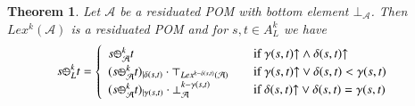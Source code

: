 \documentclass[a4paper]{elsarticle}
\newtheorem{theorem}{Theorem}
\newcommand{\1}{\mathbf{1}}
\def\odiv{{ \ominus\hspace{-8pt}:}\;}
\begin{document}
\begin{theorem}\label{prop:lexiRes}
	Let $\mathcal{A}$ be a residuated POM with bottom
	element $\bot_\mathcal{A}$.
	Then $Lex^k(\mathcal{A})$ is a residuated POM and for
	$s , t \in A^k_L$ we have
	\[
	s \odiv^k_L t = 	\begin{cases}
	\begin{array}{lcl}
	s \odiv^k_\mathcal{A} t & & \mbox{if  } \gamma(s,t){\uparrow} \wedge \delta(s,t){\uparrow} \\
	(s \odiv^k_\mathcal{A} t)_{\mid \delta(s,t)} \cdot \top_{Lex^{k-\delta(s,t)}(\mathcal{A})} & &  \mbox{if  } \gamma(s,t){\uparrow} \vee \delta(s,t) < \gamma(s,t) \\
	(s \odiv^k_\mathcal{A} t)_{\mid \gamma(s,t)} \cdot \bot^{k - \gamma(s, t)}_\mathcal{A} & & \mbox{if  } \delta(s,t){\uparrow} \vee \delta(s,t) = \gamma(s,t)
	\end{array}
	\end{cases}
	\]
\end{theorem}
\end{document}
